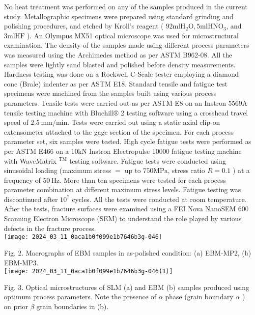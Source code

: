\documentclass[10pt]{article}
\begin{document}
No heat treatment was performed on any of the samples produced in the current study. Metallographic specimens were prepared using standard grinding and polishing procedures, and etched by Kroll's reagent ( $92 \mathrm{ml} \mathrm{H}_{2} \mathrm{O}, 5 \mathrm{ml} \mathrm{HNO}_{3}$, and $3 \mathrm{ml} \mathrm{HF}$ ). An Olympus MX51 optical microscope was used for microstructural examination. The density of the samples made using different process parameters was measured using the Archimedes method as per ASTM B962-08. All the samples were lightly sand blasted and polished before density measurements. Hardness testing was done on a Rockwell C-Scale tester employing a diamond cone (Brale) indenter as per ASTM E18. Standard tensile and fatigue test specimens were machined from the samples built using various process parameters. Tensile tests were carried out as per ASTM E8 on an Instron 5569A tensile testing machine with Bluehill® 2 testing software using a crosshead travel speed of $2.5 \mathrm{~mm} / \mathrm{min}$. Tests were carried out using a static axial clip-on extensometer attached to the gage section of the specimen. For each process parameter set, six samples were tested. High cycle fatigue tests were performed as per ASTM E466 on a $10 \mathrm{kN}$ Instron Electropulse 10000 fatigue testing machine with WaveMatrix ${ }^{\mathrm{TM}}$ testing software. Fatigue tests were conducted using sinusoidal loading (maximum stress $=$ up to $750 \mathrm{MPa}$, stress ratio $R=0.1$ ) at a frequency of $50 \mathrm{~Hz}$. More than ten specimens were tested for each process parameter combination at different maximum stress levels. Fatigue testing was discontinued after $10^{7}$ cycles. All the tests were conducted at room temperature. After the tests, fracture surfaces were examined using a FEI Nova NanoSEM 600 Scanning Electron Microscope (SEM) to understand the role played by various defects in the fracture process.\\
\texttt{[image: 2024\_03\_11\_0aca1b0f099e1b7646b3g-046]}

Fig. 2. Macrographs of EBM samples in as-polished condition: (a) EBM-MP2, (b) EBM-MP3.\\
\texttt{[image: 2024\_03\_11\_0aca1b0f099e1b7646b3g-046(1)]}

Fig. 3. Optical microstructures of SLM (a) and EBM (b) samples produced using optimum process parameters. Note the presence of $\alpha$ phase (grain boundary $\alpha$ ) on prior $\beta$ grain boundaries in (b).
\end{document}
